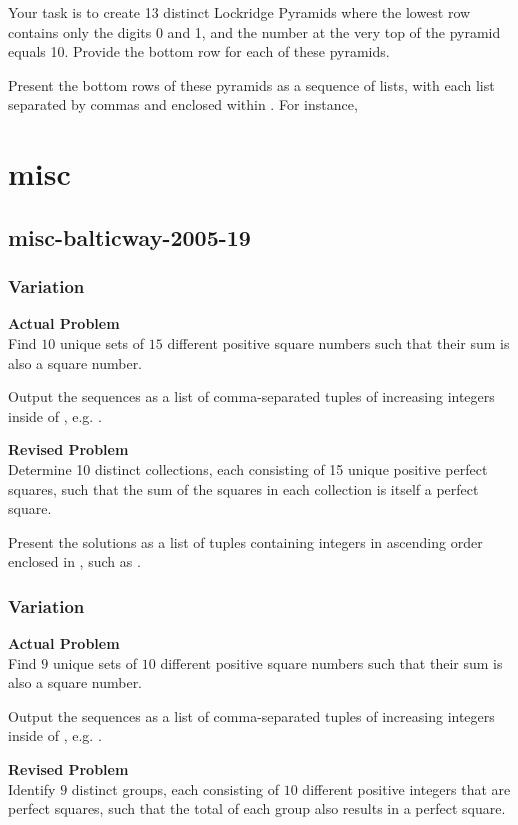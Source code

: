 Your task is to create 13 distinct Lockridge Pyramids where the lowest row contains only the digits 0 and 1, and the number at the very top of the pyramid equals 10. Provide the bottom row for each of these pyramids.

Present the bottom rows of these pyramids as a sequence of lists, with each list separated by commas and enclosed within . For instance, 

\section{misc}
\subsection{misc-balticway-2005-19}
\subsubsection{Variation}
\textbf{Actual Problem}\\
Find $10$ unique sets of $15$ different positive square numbers such that their sum is also a square number.

Output the sequences as a list of comma-separated tuples of increasing integers inside of \boxed, e.g. .

\textbf{Revised Problem}\\
Determine 10 distinct collections, each consisting of 15 unique positive perfect squares, such that the sum of the squares in each collection is itself a perfect square.

Present the solutions as a list of tuples containing integers in ascending order enclosed in \boxed, such as .

\subsubsection{Variation}
\textbf{Actual Problem}\\
Find $9$ unique sets of $10$ different positive square numbers such that their sum is also a square number.

Output the sequences as a list of comma-separated tuples of increasing integers inside of \boxed, e.g. .

\textbf{Revised Problem}\\
Identify $9$ distinct groups, each consisting of $10$ different positive integers that are perfect squares, such that the total of each group also results in a perfect square.

